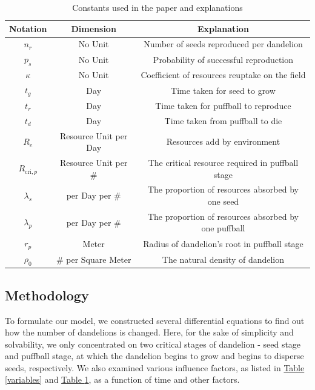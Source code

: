 \documentclass[12pt]{article}
\begin{document}
\begin{table}[hbt]
\centering
\caption{Constants used in the paper and explanations}
\label{constants}
\begin{tabular}{ccc}
    \toprule[2pt]
    Notation & Dimension & Explanation \\
    \midrule

    $n_r$ & No Unit & Number of seeds reproduced per dandelion\\
    $p_s$ & No Unit & Probability of successful reproduction\\
    $\kappa$ & No Unit & Coefficient of resources reuptake on the field \\
    $t_g$ & Day & Time taken for seed to grow \\
    $t_r$ & Day & Time taken for puffball to reproduce \\
    $t_d$ & Day & Time taken from puffball to die \\
    $R_e$ & Resource Unit per Day & Resources add by environment \\
    $R_{\text{cri},p}$ & Resource Unit per \# & The critical resource required in puffball stage \\
    $\lambda_s$ & per Day per \# & The proportion of resources absorbed by one seed \\
    $\lambda_p$ & per Day per \# & The proportion of resources absorbed by one puffball \\
    $r_p$ & Meter & Radius of dandelion's root in puffball stage \\
    $\rho_0$ & \# per Square Meter & The natural density of dandelion \\
    
    \bottomrule[2pt]
\end{tabular}
\end{table}

\subsection{Methodology}
To formulate our model, we constructed several differential equations to find out how the number of dandelions is changed. Here, for the sake of simplicity and solvability, we only concentrated on two critical stages of dandelion - seed stage and puffball stage, at which the dandelion begins to grow and begins to disperse seeds, respectively. We also examined various influence factors, as listed in \hyperref[variables]{Table \ref*{variables}} and \hyperref[constants]{Table \ref*{constants}}, as a function of time and other factors.
\end{document}

